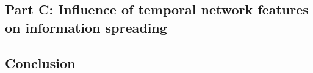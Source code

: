 \documentclass[letterpaper]{article}
\begin{document}
\subsection*{Part C: Influence of temporal network features on information spreading}
\todo{}


\subsection*{Conclusion}
\todo{}
\end{document}
